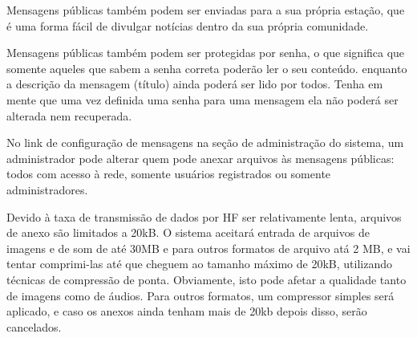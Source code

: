 \documentclass[11pt,a4paper]{article}
\begin{document}
Mensagens públicas também podem ser enviadas para a sua própria estação, que é uma forma fácil de divulgar notícias dentro da sua própria comunidade. 

Mensagens públicas também podem ser protegidas por senha, o que significa que somente aqueles que sabem a senha correta poderão ler o seu conteúdo. enquanto a descrição da mensagem (título) ainda poderá ser lido por todos. Tenha em mente que uma vez definida uma senha para uma mensagem ela não poderá ser alterada nem recuperada. 


No link de configuração de mensagens na seção de administração do sistema, um administrador pode alterar quem pode anexar arquivos às mensagens públicas: todos com acesso à rede, somente usuários registrados ou somente administradores.


Devido à taxa de transmissão de dados por HF ser relativamente lenta, arquivos de anexo são limitados a 20kB. O sistema aceitará entrada de arquivos de imagens e de som de até 30MB e para outros formatos de arquivo atá 2 MB, e vai tentar comprimi-las até que cheguem ao tamanho máximo de 20kB, utilizando técnicas de compressão de ponta. Obviamente, isto pode afetar a qualidade tanto de imagens como de áudios. Para outros formatos, um compressor simples será aplicado, e caso os anexos ainda tenham mais de 20kb depois disso, serão cancelados.

\end{document}
